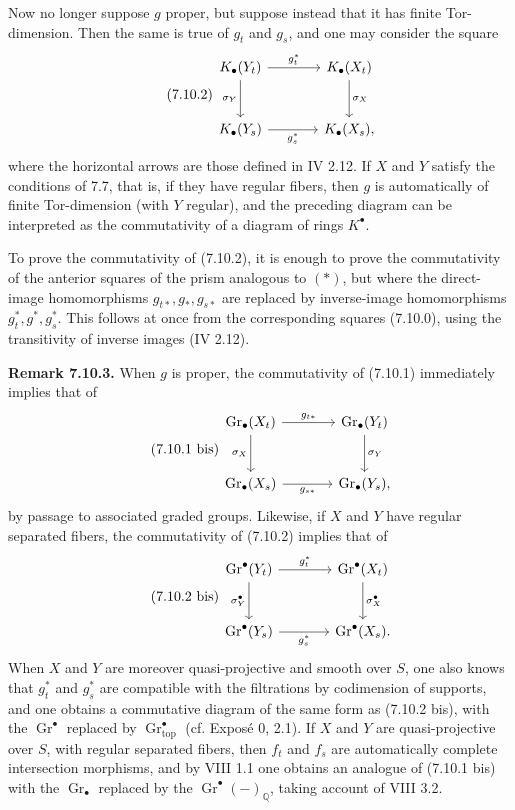 \documentclass[11pt]{article}
\newcommand{\Gr}{\operatorname{Gr}}
\providecommand{\Gr}{\operatorname{Gr}}
\providecommand{\Gr}{\operatorname{G}}
\begin{document}
Now no longer suppose \(g\) proper, but suppose instead that it has finite Tor-dimension. Then the same is true of \(g_t\) and \(g_s\), and one may consider the square
\begin{equation}\tag{7.10.2}
\begin{tikzcd}[column sep=large,row sep=large]
K_\bullet(Y_t) \arrow[r,"g_t^*"] \arrow[d,"\sigma_Y"'] &
K_\bullet(X_t) \arrow[d,"\sigma_X"]\\
K_\bullet(Y_s) \arrow[r,"g_s^*"'] &
K_\bullet(X_s),
\end{tikzcd}
\end{equation}
where the horizontal arrows are those defined in IV 2.12. If \(X\) and \(Y\) satisfy the conditions of 7.7, that is, if they have regular fibers, then \(g\) is automatically of finite Tor-dimension (with \(Y\) regular), and the preceding diagram can be interpreted as the commutativity of a diagram of rings \(K^\bullet\).

To prove the commutativity of (7.10.2), it is enough to prove the commutativity of the anterior squares of the prism analogous to \((*)\), but where the direct-image homomorphisms \(g_{t*},g_*,g_{s*}\) are replaced by inverse-image homomorphisms \(g_t^*,g^*,g_s^*\). This follows at once from the corresponding squares (7.10.0), using the transitivity of inverse images (IV 2.12).

\textbf{Remark 7.10.3.} When \(g\) is proper, the commutativity of (7.10.1) immediately implies that of
\begin{equation}\tag{7.10.1 bis}
\begin{tikzcd}[column sep=large,row sep=large]
\Gr_\bullet(X_t) \arrow[r,"g_{t*}"] \arrow[d,"\sigma_X"'] &
\Gr_\bullet(Y_t) \arrow[d,"\sigma_Y"]\\
\Gr_\bullet(X_s) \arrow[r,"g_{s*}"'] &
\Gr_\bullet(Y_s),
\end{tikzcd}
\end{equation}
by passage to associated graded groups. Likewise, if \(X\) and \(Y\) have regular separated fibers, the commutativity of (7.10.2) implies that of
\begin{equation}\tag{7.10.2 bis}
\begin{tikzcd}[column sep=large,row sep=large]
\Gr^\bullet(Y_t) \arrow[r,"g_t^*"] \arrow[d,"\sigma_Y^\bullet"'] &
\Gr^\bullet(X_t) \arrow[d,"\sigma_X^\bullet"]\\
\Gr^\bullet(Y_s) \arrow[r,"g_s^*"'] &
\Gr^\bullet(X_s).
\end{tikzcd}
\end{equation}
When \(X\) and \(Y\) are moreover quasi-projective and smooth over \(S\), one also knows that \(g_t^*\) and \(g_s^*\) are compatible with the filtrations by codimension of supports, and one obtains a commutative diagram of the same form as (7.10.2 bis), with the \(\Gr^\bullet\) replaced by \(\Gr^\bullet_{\mathrm{top}}\) (cf. Exposé 0, 2.1). If \(X\) and \(Y\) are quasi-projective over \(S\), with regular separated fibers, then \(f_t\) and \(f_s\) are automatically complete intersection morphisms, and by VIII 1.1 one obtains an analogue of (7.10.1 bis) with the \(\Gr_\bullet\) replaced by the \(\Gr^\bullet(-)_{\mathbb Q}\), taking account of VIII 3.2.
\end{document}
